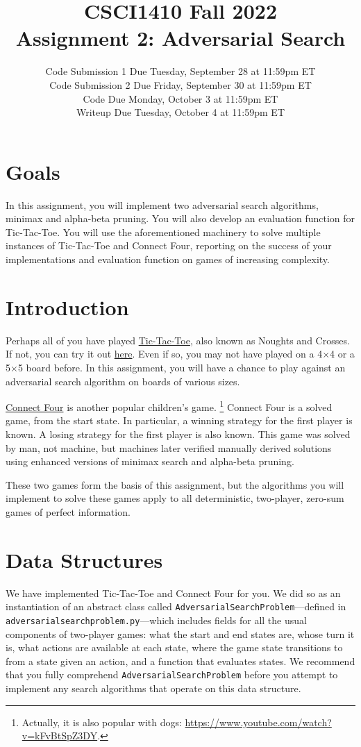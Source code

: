 \documentclass{article}
\title{CSCI1410 Fall 2022 \\
Assignment 2: Adversarial Search}
\date{%
Code Submission 1 Due Tuesday, September 28 at 11:59pm ET\\ [1ex]
Code Submission 2 Due Friday, September 30 at 11:59pm ET\\ [1ex]
Code Due Monday, October 3 at 11:59pm ET\\ [1ex]
Writeup Due Tuesday, October 4 at 11:59pm ET\\ [1ex]
}
\begin{document}
\maketitle


\section{Goals}
In this assignment, you will implement two adversarial search algorithms,
minimax and alpha-beta pruning.
You will also develop an evaluation function for Tic-Tac-Toe.
You will use the aforementioned machinery to solve multiple instances of Tic-Tac-Toe and Connect Four,
reporting on the success of your implementations and evaluation function on games of increasing complexity.


\section{Introduction}
Perhaps all of you have played \href{https://en.wikipedia.org/wiki/Tic-tac-toe}{Tic-Tac-Toe},
also known as Noughts and Crosses.
If not, you can try it out \href{https://playtictactoe.org/}{here}.
Even if so, you may not have played on a 4$\times$4 or a 5$\times$5 board before.
In this assignment, you will have a chance to play against an adversarial search algorithm on boards of various sizes.

\href{https://en.wikipedia.org/wiki/Connect_Four}{Connect Four} is another popular children's game.%
\footnote{Actually, it is also popular with dogs: \url{https://www.youtube.com/watch?v=kFvBtSpZ3DY}.}
Connect Four is a solved game, from the start state.
In particular, a winning strategy for the first player is known.
A losing strategy for the first player is also known.
This game was solved by man, not machine,
but machines later verified manually derived solutions
using enhanced versions of minimax search and alpha-beta pruning.

These two games form the basis of this assignment,
but the algorithms you will implement to solve these games apply to all
deterministic, two-player, zero-sum games of perfect information.


\section{Data Structures}
We have implemented Tic-Tac-Toe and Connect Four for you.
We did so as an instantiation of an abstract class called
\verb|AdversarialSearchProblem|---defined in \verb|adversarialsearchproblem.py|---which
includes fields for all the usual components of two-player games:
what the start and end states are,
whose turn it is,
what actions are available at each state,
where the game state transitions to from a state given an action,
and a function that evaluates states.
We recommend that you fully comprehend
\verb|AdversarialSearchProblem| before you attempt to
implement any search algorithms that operate on this data structure.
\end{document}
